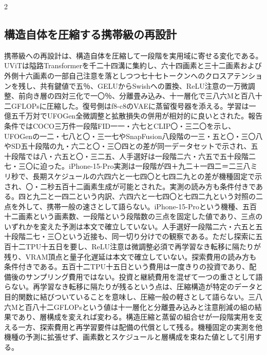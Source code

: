 \documentclass[lualatex,a4paper,10pt]{jlreq}
\begin{document}
\begin{multicols}{2}
\subsection{構造自体を圧縮する携帯級の再設計}
携帯級への再設計は、構造自体を圧縮して一段階を実用域に寄せる変化である。UViTは隘路Transformerを千二十四溝に集約し、六十四画素と三十二画素および外側十六画素の一部自己注意を落としつつ七十七トークンへのクロスアテンションを残し、共有鍵値で五％、GELUからSwishへの置換、ReLU注意の一万微調整、前向き層の四対三化で一〇％、分離畳み込み、十一層化で三八六Mと百八十二GFLOPsに圧縮した。復号側はf8-c8のVAEに蒸留復号器を添える。学習は一億五千万対でUFOGen全微調整と拡散損失の併用が相対的に良いとされた\autocite{btd082}。報告条件ではCOCO三万件一段階FID一一・六七とCLIP〇・三二〇を示し、UFOGenの一二・七八と〇・三一七やSnapFusion八段階の一三・五と〇・三〇八やSD五十段階の九・六二と〇・三〇四との差が同一データセットで示され、五十段階では八・六五と〇・三二五、人手選好は一段階二六・六五で五十段階二七・三〇に迫った。iPhone-15-Pro実測は一段階が四＋九二＋一四二＝二三八ミリ秒で、長期スケジュールの六四六と一七四〇と七四二九との差が機種固定で示され、〇・二秒五百十二画素生成が可能とされた\autocite{btd082}。実測の読み方も条件付きである。四と九二と一四二という内訳、六四六と一七四〇と七四二九という対照の二点を外して、携帯一般の速さとして語らない。iPhone-15-Proという機種、五百十二画素という画素数、一段階という段階数の三点を固定した値であり、三点のいずれかを変えた予測は本文で確立していない。人手選好一段階二六・六五と五十段階二七・三〇という近接も、同一切り分けでの観察である\autocite{btd082}。ただし探索に五百十二TPU十五日を要し、ReLU注意は微調整必須で再学習なき転移に隔たりが残り、VRAM頂点と量子化遅延は本文で確立していない\autocite{btd082}。探索費用の読み方も条件付きである。五百十二TPU十五日という費用は一度きりの投資であり、配備後のサンプリング費用ではない。投資と継続費用を混ぜて一つの重さとして語らない。再学習なき転移に隔たりが残るという点は、圧縮構造が特定のデータと目的関数に結びついていることを意味し、圧縮一般の軽さとして語らない。三八六Mと百八十二GFLOPsという値は十一層化と分離畳み込みと注意削減の組の結果であり、層構成を変えれば変わる\autocite{btd082}。構造圧縮と蒸留の組合せが一段階実用を支える一方、探索費用と再学習要件は配備の代償として残る。機種固定の実測を他機種の予測に拡張せず、画素数とスケジュールと層構成を束ねた値として引用する。


\end{multicols}
\end{document}

